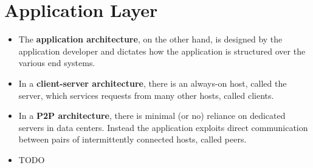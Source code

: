\section{Application Layer}
\begin{itemize}

\item The \textbf{application architecture}, on the other hand, is designed by the application developer and dictates how the application is structured over the various end systems.

\item In a \textbf{client-server architecture}, there is an always-on host, called the server, which services requests from many other hosts, called clients.

\item In a \textbf{P2P architecture}, there is minimal (or no) reliance on dedicated servers in data centers. Instead the application exploits direct communication between pairs of intermittently connected hosts, called peers.

\item TODO

\end{itemize}